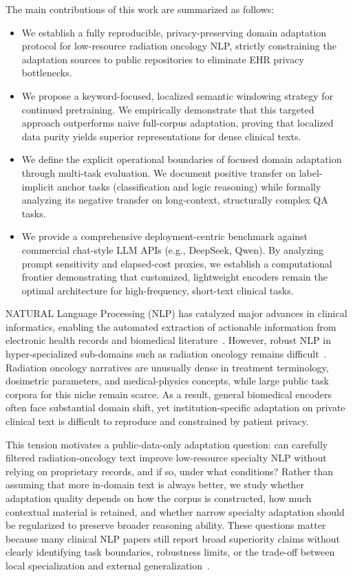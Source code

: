 \documentclass[a4paper,fleqn]{cas-dc}
\begin{document}
The main contributions of this work are summarized as follows:
\begin{itemize}
	\item We establish a fully reproducible, privacy-preserving domain adaptation protocol for low-resource radiation oncology NLP, strictly constraining the adaptation sources to public repositories to eliminate EHR privacy bottlenecks.
	\item We propose a keyword-focused, localized semantic windowing strategy for continued pretraining. We empirically demonstrate that this targeted approach outperforms naive full-corpus adaptation, proving that localized data purity yields superior representations for dense clinical texts.
	\item We define the explicit operational boundaries of focused domain adaptation through multi-task evaluation. We document positive transfer on label-implicit anchor tasks (classification and logic reasoning) while formally analyzing its negative transfer on long-context, structurally complex QA tasks.
	\item We provide a comprehensive deployment-centric benchmark against commercial chat-style LLM APIs (e.g., DeepSeek, Qwen). By analyzing prompt sensitivity and elapsed-cost proxies, we establish a computational frontier demonstrating that customized, lightweight encoders remain the optimal architecture for high-frequency, short-text clinical tasks.
\end{itemize}
\fi

NATURAL Language Processing (NLP) has catalyzed major advances in clinical informatics, enabling the automated extraction of actionable information from electronic health records and biomedical literature~\cite{thirunavukarasu2023large, bilal2025nlp}. However, robust NLP in hyper-specialized sub-domains such as radiation oncology remains difficult~\cite{khanmohammadi2025integrating, lin2024natural}. Radiation oncology narratives are unusually dense in treatment terminology, dosimetric parameters, and medical-physics concepts, while large public task corpora for this niche remain scarce. As a result, general biomedical encoders often face substantial domain shift, yet institution-specific adaptation on private clinical text is difficult to reproduce and constrained by patient privacy.

This tension motivates a public-data-only adaptation question: can carefully filtered radiation-oncology text improve low-resource specialty NLP without relying on proprietary records, and if so, under what conditions? Rather than assuming that more in-domain text is always better, we study whether adaptation quality depends on how the corpus is constructed, how much contextual material is retained, and whether narrow specialty adaptation should be regularized to preserve broader reasoning ability. These questions matter because many clinical NLP papers still report broad superiority claims without clearly identifying task boundaries, robustness limits, or the trade-off between local specialization and external generalization~\cite{wornow2023shaky}.
\end{document}

